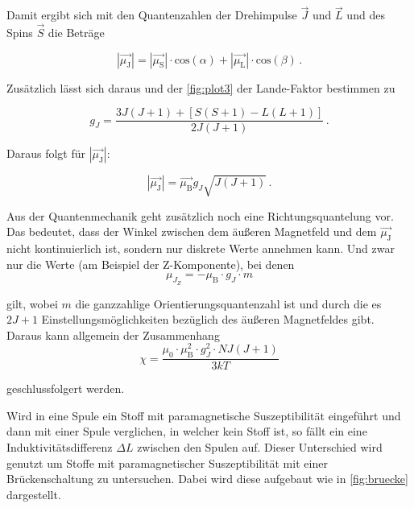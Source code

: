\noindent
Damit ergibt sich mit den Quantenzahlen der Drehimpulse $\vec{J}$ und $\vec{L}$ und des Spins $\vec{S}$ die Beträge

\begin{equation*}
        |\vec{\mu_\text{J}}| = |\vec{\mu_\text{S}}| \cdot \text{cos}\left(\alpha \right) + 
        |\vec{\mu_\text{L}}| \cdot \text{cos}\left(\beta \right) \, .
\end{equation*}

\noindent
Zusätzlich lässt sich daraus und der \autoref{fig:plot3} der Lande-Faktor bestimmen zu

\begin{equation*}
        g_J = \frac{3J(J+1) + [S(S+1) - L(L+1)]} {2 J(J+1)} \, .
        \label{eqn:lande}
\end{equation*}

\noindent
Daraus folgt für $|\vec{\mu_\text{J}}|$:

\begin{equation}
    |\vec{\mu_\text{J}}| = \vec{\mu_\text{B}} g_J \sqrt{J (J+1)}  \, .
\end{equation}

\noindent
Aus der Quantenmechanik geht zusätzlich noch eine Richtungsquantelung vor. Das bedeutet, dass der Winkel zwischen dem äußeren Magnetfeld und dem $\vec{\mu_\text{J}}$
nicht kontinuierlich ist, sondern nur diskrete Werte annehmen kann. Und zwar nur die Werte (am Beispiel der Z-Komponente), bei denen 
\begin{equation}
        \mu_{J_Z} = - \mu_\text{B} \cdot g_J \cdot m
\end{equation}

\noindent
gilt, wobei $m$ die ganzzahlige Orientierungsquantenzahl ist und durch die es $2J+1$ Einstellungsmöglichkeiten bezüglich des äußeren Magnetfeldes gibt. Daraus kann allgemein der
Zusammenhang 
\begin{equation}
        \chi = \frac{\mu_0 \cdot \mu_\text{B}^2 \cdot g_J^2 \cdot N J (J+1)}{3kT}
        \label{eqn:theo}
\end{equation}

\noindent
geschlussfolgert werden.

\noindent
Wird in eine Spule ein Stoff mit paramagnetische Suszeptibilität eingeführt und dann mit einer Spule verglichen, in welcher kein Stoff ist, so fällt ein eine Induktivitätsdifferenz
$\Delta L$ zwischen den Spulen auf. Dieser Unterschied wird genutzt um Stoffe mit paramagnetischer Suszeptibilität mit einer Brückenschaltung zu untersuchen.
Dabei wird diese aufgebaut wie in \autoref{fig:bruecke} dargestellt.

